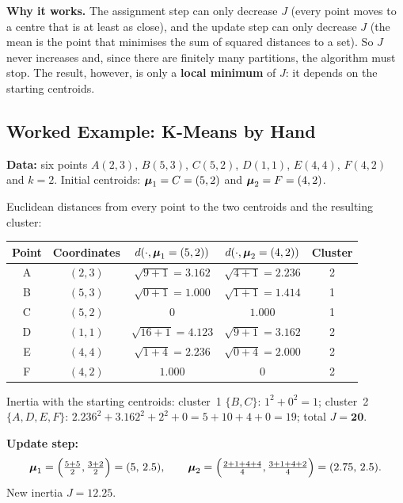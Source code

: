 \textbf{Why it works.} The assignment step can only decrease $J$ (every point moves to a centre that is at least as close), and the update step can only decrease $J$ (the mean is the point that minimises the sum of squared distances to a set). So $J$ never increases and, since there are finitely many partitions, the algorithm must stop. The result, however, is only a \textbf{local minimum} of $J$: it depends on the starting centroids.

\subsection{Worked Example: K-Means by Hand}\label{sec:kmex}

\textbf{Data:} six points $A(2,3)$, $B(5,3)$, $C(5,2)$, $D(1,1)$, $E(4,4)$, $F(4,2)$ and $k=2$. Initial centroids: $\boldsymbol{\mu}_1=C=(5,2)$ and $\boldsymbol{\mu}_2=F=(4,2)$.

\begin{example}[: Iteration 1]
Euclidean distances from every point to the two centroids and the resulting cluster:

\begin{center}
\begin{tabular}{@{}c|c|cc|c@{}}
\toprule
Point & Coordinates & $d(\cdot,\boldsymbol{\mu}_1=(5,2))$ & $d(\cdot,\boldsymbol{\mu}_2=(4,2))$ & Cluster\\
\midrule
A & $(2,3)$ & $\sqrt{9+1}=3.162$ & $\sqrt{4+1}=2.236$ & 2\\
B & $(5,3)$ & $\sqrt{0+1}=1.000$ & $\sqrt{1+1}=1.414$ & 1\\
C & $(5,2)$ & $0$ & $1.000$ & 1\\
D & $(1,1)$ & $\sqrt{16+1}=4.123$ & $\sqrt{9+1}=3.162$ & 2\\
E & $(4,4)$ & $\sqrt{1+4}=2.236$ & $\sqrt{0+4}=2.000$ & 2\\
F & $(4,2)$ & $1.000$ & $0$ & 2\\
\bottomrule
\end{tabular}
\end{center}

Inertia with the starting centroids: cluster~1 $\{B,C\}$: $1^2+0^2=1$; cluster~2 $\{A,D,E,F\}$: $2.236^2+3.162^2+2^2+0=5+10+4+0=19$; total $J=\mathbf{20}$.

\medskip
\textbf{Update step:}
\[
  \boldsymbol{\mu}_1=\Big(\tfrac{5+5}{2},\tfrac{3+2}{2}\Big)=(5,\,2.5),\qquad
  \boldsymbol{\mu}_2=\Big(\tfrac{2+1+4+4}{4},\tfrac{3+1+4+2}{4}\Big)=(2.75,\,2.5).
\]
New inertia $J=\mathbf{12.25}$.
\end{example}

